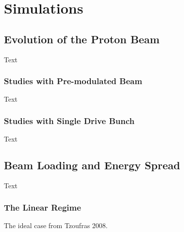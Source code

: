 %
%

\chapter{Simulations}
\label{Ch:Sim}


\section{Evolution of the Proton Beam}
\label{Sim:PBeam}

Text


\subsection{Studies with Pre-modulated Beam}
\label{Sim:PBPreMod}

Text


\subsection{Studies with Single Drive Bunch}
\label{Sim:PBSingle}

Text


\section{Beam Loading and Energy Spread}
\label{Sim:BLoad}

Text


\subsection{The Linear Regime}
\label{Sim:Lin}

The ideal case from Tzoufras 2008.


